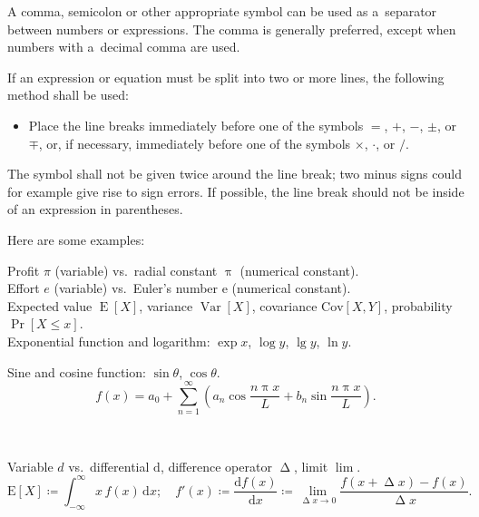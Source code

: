 \documentclass[11pt, a4paper, oneside]{article}
\newlength{\baselinedist}
\newlength{\smalllinespacing}
\renewenvironment{quotation}{%
	\list{}{%
		\baselineskip = \smalllinespacing%
		\leftmargin = \baselineskip%
		\rightmargin = \leftmargin%
		\listparindent = \smalllinespacing%
		\parsep = 0pt%
		\topsep = 0.5\baselinedist plus 3ex
	}%
	\item\relax%
}{%
	\endlist%
}
\newcommand{\dd}{\mathrm{d}}
\theoremstyle{Plain}
\theoremstyle{Definition}
\theoremstyle{Remark}
\begin{document}
\begin{quotation}
	A comma, semicolon or other appropriate symbol can be used as a~separator between numbers or expressions. The comma is generally preferred, except when numbers with a~decimal comma are used. \par
	If an expression or equation must be split into two or more lines, the following method shall be used:
	\begin{itemize}[leftmargin = \baselineskip, labelsep = 0.25\baselineskip]
		\item[---] Place the line breaks immediately before one of the symbols $=$, $+$, $-$, $\pm$, or $\mp$, or, if necessary, immediately before one of the symbols $\times$, $\cdot$, or $/$.
	\end{itemize}
	The symbol shall not be given twice around the line break; two minus signs could for example give rise to sign errors. If possible, the line break should not be inside of an expression in parentheses.
\end{quotation}

Here are some examples:

\begin{longtblr}{}
	Profit $\pi$ (variable) vs.\ radial constant $\uppi$ (numerical constant). \\
	Effort $e$ (variable) vs.\ Euler's number $\mathrm{e}$ (numerical constant). \\
	Expected value $\operatorname{E}[X]$, variance $\operatorname{Var}[X]$, covariance $\mathrm{Cov}[X, Y]$, probability $\Pr[{X \le x}]$. \\
	Exponential function and logarithm: $\exp x$, $\log y$, $\lg y$, $\ln y$. \\
	\begin{minipage}{\linewidth}\noindent%
		Sine and cosine function: $\sin \theta$, $\cos \theta$.
		\begin{equation}
			f(x) = a_0 + \sum_{n=1}^\infty \left(a_n \cos \frac{n \uppi x}{L} + b_n \sin \frac{n \uppi x}{L} \right).
		\end{equation}
	\end{minipage} \\
	\begin{minipage}{\linewidth}\noindent%
		Variable $d$ vs.\ differential $\dd$, difference operator $\upDelta$, limit $\lim$.
		\begin{equation}
			\mathrm{E}[X] \coloneq \int_{-\infty}^{\infty} x\,f(x)\,\dd x; \quad
			f'(x) \coloneq \frac{\dd f(x)}{\dd x} \coloneq \lim_{\upDelta x \to 0} \frac{f(x + \upDelta x) - f(x)}{\upDelta x}.
		\end{equation}
	\end{minipage}\vspace{0.333\smallskipamount}
\end{longtblr}
\end{document}
